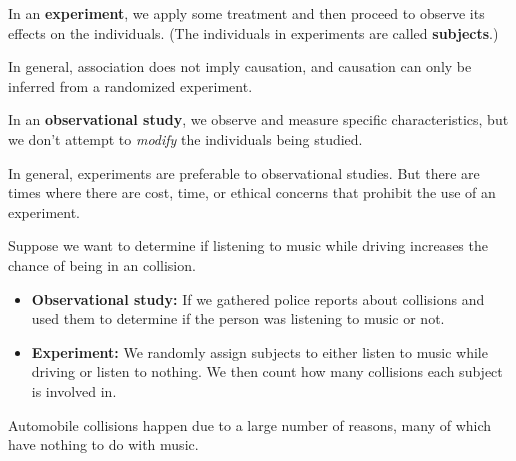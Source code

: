 \documentclass{beamer}
\begin{document}
\begin{frame}
\begin{definition}
In an \textbf{experiment}, we apply some treatment and then proceed to observe its effects on the individuals. (The individuals in experiments are called \textbf{subjects}.)
\end{definition}\pause

\begin{note}
In general, association does not imply causation, and causation can only be inferred from a randomized experiment.
\end{note}\pause

\begin{definition}
In an \textbf{observational study}, we observe and measure specific characteristics, but we don't attempt to \emph{modify} the individuals being studied.
\end{definition}\pause

\begin{note}
In general, experiments are preferable to observational studies. But there are times where there are cost, time, or ethical concerns that prohibit the use of an experiment.
\end{note}
\end{frame}

\begin{frame}
\begin{example}
Suppose we want to determine if listening to music while driving increases the chance of being in an collision.\pause
\begin{itemize}
\item \textbf{Observational study:} If we gathered police reports about collisions and used them to determine if the person was listening to music or not.\pause
\item \textbf{Experiment:} We randomly assign subjects to either listen to music while driving or listen to nothing. We then count how many collisions each subject is involved in.\pause
\end{itemize}
\pause

Automobile collisions happen due to a large number of reasons, many of which have nothing to do with music.
\end{example}
\end{frame}
\end{document}
